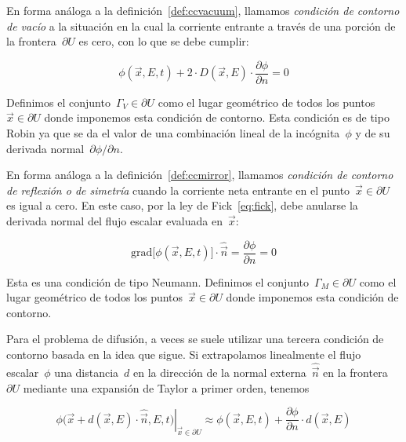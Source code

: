 \begin{definicion}
\label{def:ccvacuumdif}
En forma análoga a la definición~\ref{def:ccvacuum}, llamamos \emph{condición de contorno de vacío} a la situación en la cual la corriente entrante a través de una porción de la frontera~$\partial U$ es cero, con lo que se debe cumplir:

\begin{equation}\label{eq:ccvacuumdif}
\phi(\vec{x}, E, t)  + 2 \cdot D(\vec{x}, E) \cdot \frac{\partial \phi}{\partial n} = 0
\end{equation}

Definimos el conjunto~$\Gamma_V \in \partial U$ como el lugar geométrico de todos los puntos~$\vec{x} \in \partial U$ donde imponemos esta condición de contorno. Esta condición es de tipo Robin ya que se da el valor de una combinación lineal de la incógnita~$\phi$ y de su derivada normal~$\partial \phi/\partial n$.
\end{definicion}

\begin{definicion}
\label{def:ccmirrordif}
En forma análoga a la definición~\ref{def:ccmirror}, llamamos \emph{condición de contorno de reflexión o de simetría} cuando la corriente neta entrante en el punto~$\vec{x} \in \partial U$ es igual a cero. En este caso, por la ley de Fick~\eqref{eq:fick}, debe anularse la derivada normal del flujo escalar evaluada en~$\vec{x}$:

\begin{equation*}
\text{grad} \big[ \phi(\vec{x}, E, t)\big]  \cdot \hat{\vec{n}} = \frac{\partial \phi}{\partial n} = 0
\end{equation*}

Esta es una condición de tipo Neumann. Definimos el conjunto~$\Gamma_M \in \partial U$ como el lugar geométrico de todos los puntos~$\vec{x} \in \partial U$ donde imponemos esta condición de contorno.
\end{definicion}


\medskip

Para el problema de difusión, a veces se suele utilizar una tercera condición de contorno basada en la idea que sigue. Si extrapolamos linealmente el flujo escalar~$\phi$ una distancia~$d$ en la dirección de la normal externa~$\hat{\vec{n}}$ en la frontera~$\partial U$ mediante una expansión de Taylor a primer orden, tenemos

\begin{equation*}
 \left. \phi \big(\vec{x} + d(\vec{x}, E) \cdot \hat{\vec{n}}, E, t \big) \right|_{\vec{x} \in \partial U} \approx \phi(\vec{x}, E, t) + \frac{\partial \phi}{\partial n} \cdot d(\vec{x}, E)
\end{equation*}

